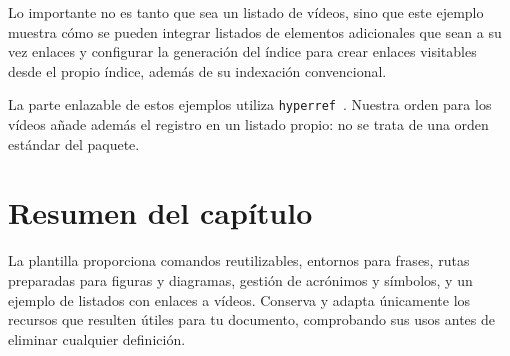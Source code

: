 Lo importante no es tanto que sea un listado de vídeos, sino que este ejemplo muestra cómo se pueden integrar listados de elementos adicionales que sean a su vez enlaces y configurar la generación del índice para crear enlaces visitables desde el propio índice, además de su indexación convencional.

La parte enlazable de estos ejemplos utiliza \texttt{hyperref}~\cite{hyperref-manual}. Nuestra orden para los vídeos añade además el registro en un listado propio: no se trata de una orden estándar del paquete.

\section{Resumen del capítulo}
\label{sec:resumen-elementos-utilidad}

La plantilla proporciona comandos reutilizables, entornos para frases, rutas preparadas para figuras y diagramas, gestión de acrónimos y símbolos, y un ejemplo de listados con enlaces a vídeos. Conserva y adapta únicamente los recursos que resulten útiles para tu documento, comprobando sus usos antes de eliminar cualquier definición.

